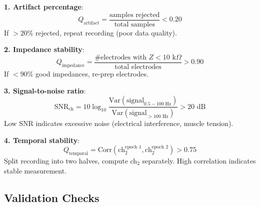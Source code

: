 \begin{defn}\label{def:quality}
\textbf{1. Artifact percentage}:
\begin{equation}
Q_{\text{artifact}} = \frac{\text{samples rejected}}{\text{total samples}} < 0.20
\end{equation}
If $> 20\%$ rejected, repeat recording (poor data quality).

\textbf{2. Impedance stability}:
\begin{equation}
Q_{\text{impedance}} = \frac{\text{\# electrodes with } Z < 10 \text{ k}\Omega}{\text{total electrodes}} > 0.90
\end{equation}
If $< 90\%$ good impedances, re-prep electrodes.

\textbf{3. Signal-to-noise ratio}:
\begin{equation}
\text{SNR}_{\text{ch}} = 10 \log_{10} \frac{\text{Var}(\text{signal}_{0.5-100\text{ Hz}})}{\text{Var}(\text{signal}_{> 100\text{ Hz}})} > 20 \text{ dB}
\end{equation}
Low SNR indicates excessive noise (electrical interference, muscle tension).

\textbf{4. Temporal stability}:
\begin{equation}
Q_{\text{temporal}} = \text{Corr}(\text{ch}_2^{\text{epoch 1}}, \text{ch}_2^{\text{epoch 2}}) > 0.75
\end{equation}
Split recording into two halves, compute ch$_2$ separately. High correlation indicates stable measurement.
\end{defn}

\subsection{Validation Checks}

